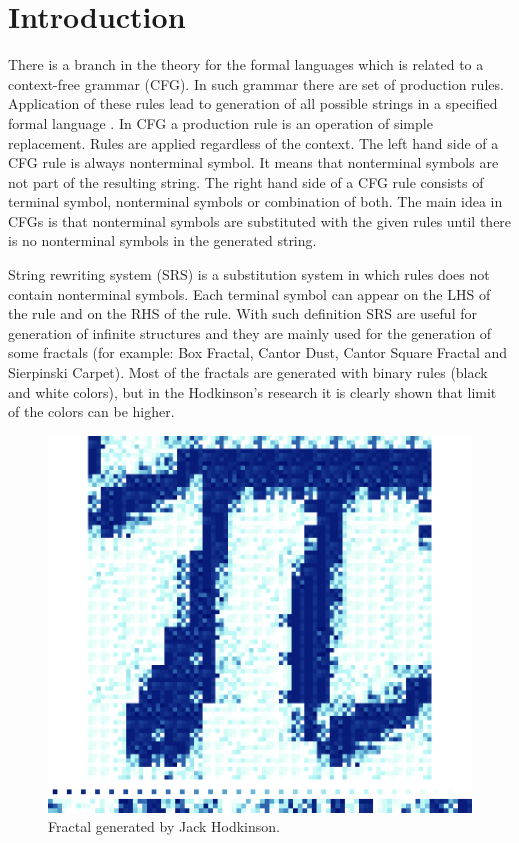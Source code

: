\documentclass{llncs}
\begin{document}
\section{Introduction} \label{Introduction}

There is a branch in the theory for the formal languages which is related to a context-free grammar (CFG). In such grammar there are set of production rules. Application of these rules lead to generation of all possible strings in a specified formal language \cite{ochoa01}. In CFG a production rule is an operation of simple replacement. Rules are applied regardless of the context. The left hand side of a CFG rule is always nonterminal symbol. It means that nonterminal symbols are not part of the resulting string. The right hand side of a CFG rule consists of terminal symbol, nonterminal symbols or combination of both. The main idea in CFGs is that nonterminal symbols are substituted with the given rules until there is no nonterminal symbols in the generated string. 

String rewriting system (SRS) is a substitution system in which rules does not contain nonterminal symbols. Each terminal symbol can appear on the LHS of the rule and on the RHS of the rule. With such definition SRS are useful for generation of infinite structures and they are mainly used for the generation of some fractals (for example: Box Fractal, Cantor Dust, Cantor Square Fractal and Sierpinski Carpet). Most of the fractals are generated with binary rules (black and white colors), but in the Hodkinson's research it is clearly shown that limit of the colors can be higher. 

\begin{figure}[h]
  \centering
  \includegraphics[width=1.0\linewidth]{pic01}
  \caption{Fractal generated by Jack Hodkinson.}
\label{fig:pic01}
\end{figure}
\end{document}
